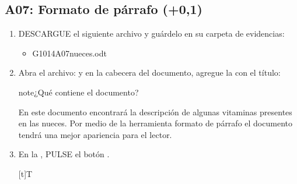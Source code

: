 \documentclass[letterpaper,10pt,spanish]{sphinxmanual}
\let\sphinxpxdimen\pdfpxdimen\else\newdimen\sphinxpxdimen
\begin{document}
\subsection{A07: Formato de párrafo  (+0,1)}
\label{\detokenize{1_guias/10ofimatica/G1014:a07-formato-de-parrafo-103-0-1}}
\sphinxAtStartPar
{}
\begin{enumerate}
%
\item {} 
\sphinxAtStartPar
DESCARGUE el siguiente archivo y guárdelo en su carpeta de evidencias:
\begin{itemize}
\item {} 
\sphinxAtStartPar
G1014A07\sphinxhyphen{}nueces.odt 

\end{itemize}

\item {} 
\sphinxAtStartPar
Abra el archivo:  y en la cabecera del documento, agregue la  con el título: 

\begin{sphinxadmonition}{note}{¿Qué contiene el documento?}

\sphinxAtStartPar
En este documento encontrará la descripción de algunas vitaminas presentes en las nueces. Por medio de la herramienta formato de párrafo el documento tendrá una mejor apariencia para el lector.
\end{sphinxadmonition}

\item {} 
\sphinxAtStartPar
En la , PULSE el botón .


\begin{savenotes}\sphinxattablestart
\sphinxthistablewithglobalstyle
\centering
\begin{tabulary}{\linewidth}[t]{T}
\sphinxtoprule
\sphinxtableatstartofbodyhook

\begin{sphinxfigure-in-table}
\centering

\noindent\sphinxincludegraphics[width=50\sphinxpxdimen]{{image113}.png}
\end{sphinxfigure-in-table}\relax
\\
\sphinxbottomrule
\end{tabulary}
\sphinxtableafterendhook\par
\sphinxattableend\end{savenotes}


\end{enumerate}
\end{document}
